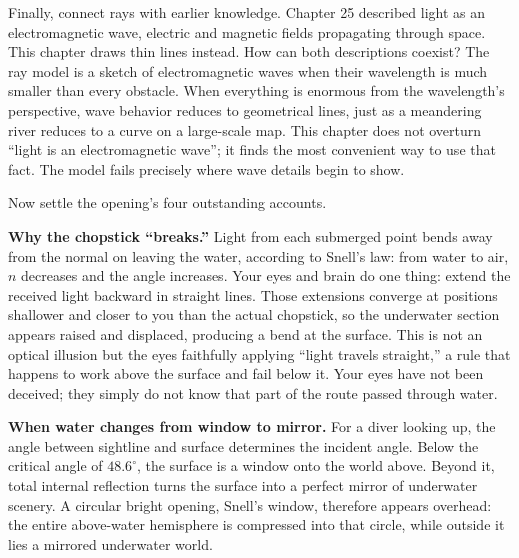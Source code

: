Finally, connect rays with earlier knowledge. Chapter 25 described light as an electromagnetic wave, electric and magnetic fields propagating through space. This chapter draws thin lines instead. How can both descriptions coexist? The ray model is a sketch of electromagnetic waves when their wavelength is much smaller than every obstacle. When everything is enormous from the wavelength's perspective, wave behavior reduces to geometrical lines, just as a meandering river reduces to a curve on a large-scale map. This chapter does not overturn ``light is an electromagnetic wave''; it finds the most convenient way to use that fact. The model fails precisely where wave details begin to show.


Now settle the opening's four outstanding accounts.

\textbf{Why the chopstick ``breaks.''} Light from each submerged point bends away from the normal on leaving the water, according to Snell's law: from water to air, \(n\) decreases and the angle increases. Your eyes and brain do one thing: extend the received light backward in straight lines. Those extensions converge at positions shallower and closer to you than the actual chopstick, so the underwater section appears raised and displaced, producing a bend at the surface. This is not an optical illusion but the eyes faithfully applying ``light travels straight,'' a rule that happens to work above the surface and fail below it. Your eyes have not been deceived; they simply do not know that part of the route passed through water.

\textbf{When water changes from window to mirror.} For a diver looking up, the angle between sightline and surface determines the incident angle. Below the critical angle of \(48.6^\circ\), the surface is a window onto the world above. Beyond it, total internal reflection turns the surface into a perfect mirror of underwater scenery. A circular bright opening, Snell's window, therefore appears overhead: the entire above-water hemisphere is compressed into that circle, while outside it lies a mirrored underwater world.

